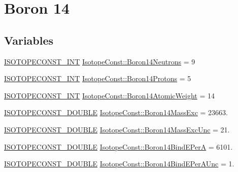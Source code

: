 \hypertarget{group___isotope_const-_boron-_b14}{}\section{Boron 14}
\label{group___isotope_const-_boron-_b14}
\subsection*{Variables}
\begin{DoxyCompactItemize}
\item 
\mbox{\hyperlink{group___isotope_const-_macros_ga5f18360b3e99483a35c32d789e62621c}{I\+S\+O\+T\+O\+P\+E\+C\+O\+N\+S\+T\+\_\+\+I\+NT}} \mbox{\hyperlink{group___isotope_const-_boron-_b14_gaf673ce21aa743fba080eeb5b94a2ddc4}{Isotope\+Const\+::\+Boron14\+Neutrons}} = 9
\item 
\mbox{\hyperlink{group___isotope_const-_macros_ga5f18360b3e99483a35c32d789e62621c}{I\+S\+O\+T\+O\+P\+E\+C\+O\+N\+S\+T\+\_\+\+I\+NT}} \mbox{\hyperlink{group___isotope_const-_boron-_b14_ga3f0a36fd788e21b7d3c7d70cbc8a18cb}{Isotope\+Const\+::\+Boron14\+Protons}} = 5
\item 
\mbox{\hyperlink{group___isotope_const-_macros_ga5f18360b3e99483a35c32d789e62621c}{I\+S\+O\+T\+O\+P\+E\+C\+O\+N\+S\+T\+\_\+\+I\+NT}} \mbox{\hyperlink{group___isotope_const-_boron-_b14_ga7698ce9a0d801fa58b95e6fe496a78da}{Isotope\+Const\+::\+Boron14\+Atomic\+Weight}} = 14
\item 
\mbox{\hyperlink{group___isotope_const-_macros_ga8f45a7272ce02c0b4c65c44636ed719a}{I\+S\+O\+T\+O\+P\+E\+C\+O\+N\+S\+T\+\_\+\+D\+O\+U\+B\+LE}} \mbox{\hyperlink{group___isotope_const-_boron-_b14_gaa12538ab60bb0b88a250763ffe003e69}{Isotope\+Const\+::\+Boron14\+Mass\+Exc}} = 23663.
\item 
\mbox{\hyperlink{group___isotope_const-_macros_ga8f45a7272ce02c0b4c65c44636ed719a}{I\+S\+O\+T\+O\+P\+E\+C\+O\+N\+S\+T\+\_\+\+D\+O\+U\+B\+LE}} \mbox{\hyperlink{group___isotope_const-_boron-_b14_ga0b206ebcf6980e956f619ae13c1a0863}{Isotope\+Const\+::\+Boron14\+Mass\+Exc\+Unc}} = 21.
\item 
\mbox{\hyperlink{group___isotope_const-_macros_ga8f45a7272ce02c0b4c65c44636ed719a}{I\+S\+O\+T\+O\+P\+E\+C\+O\+N\+S\+T\+\_\+\+D\+O\+U\+B\+LE}} \mbox{\hyperlink{group___isotope_const-_boron-_b14_ga276e64064ba2aa21c52d54ea1480a328}{Isotope\+Const\+::\+Boron14\+Bind\+E\+PerA}} = 6101.
\item 
\mbox{\hyperlink{group___isotope_const-_macros_ga8f45a7272ce02c0b4c65c44636ed719a}{I\+S\+O\+T\+O\+P\+E\+C\+O\+N\+S\+T\+\_\+\+D\+O\+U\+B\+LE}} \mbox{\hyperlink{group___isotope_const-_boron-_b14_gae24c809cf1fca5c365241d34c2a541cd}{Isotope\+Const\+::\+Boron14\+Bind\+E\+Per\+A\+Unc}} = 1.

\end{DoxyCompactItemize}
